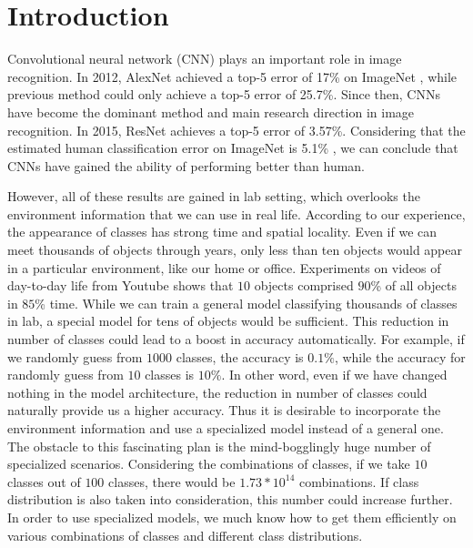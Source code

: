 \documentclass{article}
\begin{document}
\section{Introduction}
Convolutional neural network (CNN) plays an important role in image recognition. In 2012, AlexNet \cite{krizhevsky2012imagenet} achieved a top-5 error of 17\% on ImageNet \cite{deng2009imagenet}, while previous method could only achieve a top-5 error of 25.7\%. Since then, CNNs have become the dominant method and main research direction in image recognition. In 2015, ResNet \cite{he2016deep} achieves a top-5 error of 3.57\%. Considering that the estimated human classification error on ImageNet is 5.1\% \cite{russakovsky2015imagenet}, we can conclude that CNNs have gained the ability of performing better than human. 



{\color{blue}However, all of these results are gained in lab setting, which overlooks the environment information that we can use in real life. According to our experience, the appearance of classes has strong time and spatial locality. Even if we can meet thousands of objects through years, only less than ten objects would appear in a particular environment, like our home or office. Experiments on videos of day-to-day life from Youtube \cite{shen2017fast} shows that $10$ objects comprised $90$\% of all objects in $85$\% time. While we can train a general model classifying thousands of classes in lab, a special model for tens of objects would be sufficient. This reduction in number of classes could lead to a boost in accuracy automatically. For example, if we randomly guess from $1000$ classes, the accuracy is $0.1\%$, while the accuracy for randomly guess from $10$ classes is $10\%$. In other word, even if we have changed nothing in the model architecture, the reduction in number of classes could naturally provide us a higher accuracy. Thus it is desirable to incorporate the environment information and use a specialized model instead of a general one. The obstacle to this fascinating plan is the mind-bogglingly huge number of specialized scenarios. Considering the combinations of classes, if we take $10$ classes out of $100$ classes, there would be $1.73*10^{14}$ combinations. If class distribution is also taken into consideration, this number could increase further. In order to use specialized models, we much know how to get them efficiently on various combinations of classes and different class distributions.} 
\end{document}
